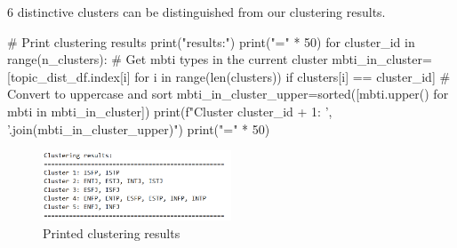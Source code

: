 \documentclass[12pt]{article}
\numberwithin{figure}{section}  %
\begin{document}
	6 distinctive clusters can be distinguished from our clustering results.
	\begin{python}
    # Print clustering results
    print("\nClustering results:")
    print("=" * 50)
    for cluster_id in range(n_clusters):
        # Get mbti types in the current cluster
        mbti_in_cluster=[topic_dist_df.index[i] for i in range(len(clusters)) if clusters[i] == cluster_id]
        # Convert to uppercase and sort
        mbti_in_cluster_upper=sorted([mbti.upper() for mbti in mbti_in_cluster])
        print(f"Cluster {cluster_id + 1}: {', '.join(mbti_in_cluster_upper)}")
    print("=" * 50)
	\end{python}

	\begin{figure}[H]
			\centering
			\includegraphics[width=0.5\textwidth]{Q2cluster1} 
			\caption{\centering Printed clustering results}		
	\end{figure}
	
\end{document}
